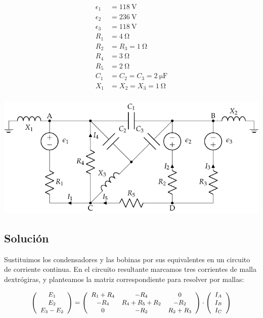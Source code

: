 \documentclass[10pt]{article}
\begin{document}
\begin{minipage}[c]{0.3\linewidth}
  \begin{align*}
    \epsilon_{1}&=\SI{118}{\volt}\\
    \epsilon_{2}&=\SI{236}{\volt}\\
    \epsilon_{3}&=\SI{118}{\volt}\\
    R_{1}&= \SI{4}{\ohm}\\
    R_{2}&=R_{3}=\SI{1}{\ohm}\\
    R_{4}&= \SI{3}{\ohm}\\
    R_{5}&= \SI{2}{\ohm}\\
    C_{1}&=C_{2}=C_{3}=\SI{2}{\micro\farad}\\
    X_1 &= X_2 = X_3 = \SI{1}{\ohm}\\
  \end{align*}
\end{minipage}
\begin{minipage}[c]{0.7\linewidth}
  \includegraphics{figs/mallas_condensadores.pdf}
\end{minipage}

\subsection*{Solución}
Sustituimos los condensadores y las bobinas por sus equivalentes en un circuito de corriente continua. En el circuito resultante marcamos tres corrientes de malla dextrógiras, y planteamos la matriz correspondiente para resolver por mallas: 

\[
\small{
\left(\begin{array}{c}
    E_1\\
    E_2\\
    E_3 - E_2
  \end{array}\right) = \left(\begin{array}{ccc}
    R_1 + R_4 & -R_4 & 0\\
    -R_4 & R_4 + R_5 + R_2 & -R_{2}\\
    0 & -R_2 & R_2 + R_3
  \end{array}\right) \cdot \left(\begin{array}{c}
    I_{A}\\
    I_{B}\\
    I_{C}
  \end{array}\right)
}
\]
\end{document}
